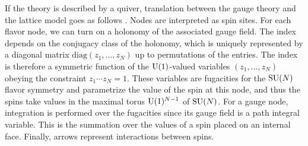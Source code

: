 If the theory is described by a quiver, translation between the gauge
theory and the lattice model goes as follows \cite{Yamazaki:2012cp,Yamazaki:2013nra}.
Nodes are interpreted as spin sites. For each flavor node, we can
turn on a holonomy of the associated gauge field. The index depends
on the conjugacy class of the holonomy, which is uniquely represented
by a diagonal matrix $\mathrm{diag}(z_{1},\ldots,z_{N})$ up to permutations
of the entries. The index is therefore a symmetric function of the
$\mathrm{U}(1)$-valued variables $(z_{1},\ldots,z_{N})$ obeying the constraint
$z_{1}\cdots z_{N}=1$. These variables are fugacities for the $\mathrm{SU}(N)$
flavor symmetry and parametrize the value of the spin at this node,
and thus the spins take values in the maximal torus $\mathrm{U}(1)^{N-1}$
of $\mathrm{SU}(N)$. For a gauge node, integration is performed over the fugacities
since its gauge field is a path integral variable. This is the summation
over the values of a spin placed on an internal face. Finally, arrows
represent interactions between spins. 

